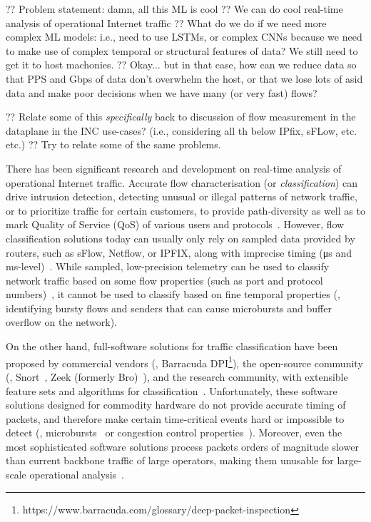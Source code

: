 ?? Problem statement: damn, all this ML is cool
?? We can do cool real-time analysis of operational Internet traffic
?? What do we do if we need more complex ML models: i.e., need to use LSTMs, or complex CNNs because we need to make use of complex temporal or structural features of data? We still need to get it to host machonies.
?? Okay... but in that case, how can we reduce data so that PPS and Gbps of data don't overwhelm the host, or that we lose lots of asid data and make poor decisions when we have many (or very fast) flows?

?? Relate some of this \emph{specifically} back to discussion of flow measurement in the dataplane in the INC use-cases? (i.e., considering all th below IPfix, sFLow, etc. etc.)
?? Try to relate some of the same problems.

There has been significant research and development on real-time analysis of operational Internet traffic.
Accurate flow characterisation (or \emph{classification}) can drive intrusion detection, detecting unusual or illegal patterns of network traffic, or to prioritize traffic for certain customers, to provide path-diversity as well as to mark Quality of Service (QoS) of various users and protocols~\parencite{DBLP:journals/ccr/BernailleTASS06,DBLP:conf/lisa/Roesch99}.
However, flow classification solutions today can usually only rely on sampled data provided by routers, such as sFlow, Netflow, or IPFIX, along with imprecise timing (\si{\micro\second} and \si{\milli\second}-level)~\parencite{rfc7011,rfc3954}.
While sampled, low-precision telemetry can be used to classify network traffic based on some flow properties (such as port and protocol numbers)~\parencite{DBLP:conf/iwcmc/RossiV10}, it cannot be used to classify based on fine temporal properties (\eg, identifying bursty flows and senders that can cause microbursts and buffer overflow on the network).

On the other hand, full-software solutions for traffic classification have been proposed by commercial vendors (\eg, Barracuda DPI\footnote{https://www.barracuda.com/glossary/deep-packet-inspection}), the open-source community (\eg, Snort~\parencite{DBLP:conf/lisa/Roesch99}, Zeek (formerly Bro)~\parencite{DBLP:conf/uss/Paxson98,zeek}), and the research community, with extensible feature sets and algorithms for classification~\parencite{DBLP:conf/icccn/HagosEYK18}.
Unfortunately, these software solutions designed for commodity hardware do not provide accurate timing of packets, and therefore make certain time-critical events hard or impossible to detect (\eg, microbursts~\parencite{DBLP:conf/sigcomm/ChenFKRR18} or congestion control properties~\parencite{DBLP:conf/icccn/HagosEYK18}).
Moreover, even the most sophisticated software solutions process packets orders of magnitude slower than current backbone traffic of large operators, making them unusable for large-scale operational analysis~\parencite{DBLP:journals/wpc/ParkA17}.

